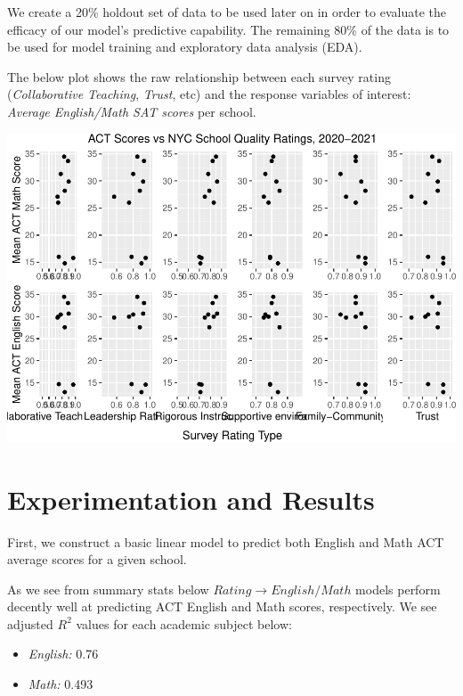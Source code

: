 \documentclass[
  man]{apa6}
\providecommand{\tightlist}{%
  \setlength{\itemsep}{0pt}\setlength{\parskip}{0pt}}
\begin{document}
We create a 20\% holdout set of data to be used later on in order to evaluate the efficacy of our model's predictive capability. The remaining 80\% of the data is to be used for model training and exploratory data analysis (EDA).

The below plot shows the raw relationship between each survey rating (\emph{Collaborative Teaching}, \emph{Trust}, etc) and the response variables of interest: \emph{Average English/Math SAT scores} per school.

\includegraphics{final-project_files/figure-latex/plot-relationships-1.pdf}

\hypertarget{experimentation-and-results}{%
\section{Experimentation and Results}\label{experimentation-and-results}}

First, we construct a basic linear model to predict both English and Math ACT average scores for a given school.

As we see from summary stats below \(Rating \rightarrow English/Math\) models perform decently well at predicting ACT English and Math scores, respectively. We see adjusted \(R^2\) values for each academic subject below:

\begin{itemize}
\tightlist
\item
  \emph{English:} 0.76
\item
  \emph{Math:} 0.493
\end{itemize}
\end{document}

